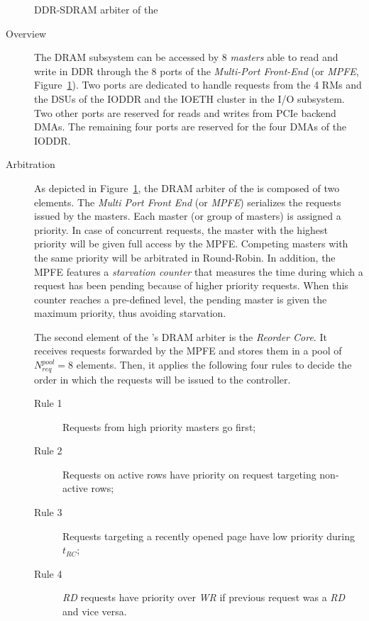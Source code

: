 \documentclass[main.tex]{subfiles}
\begin{document}
\begin{figure}
    \centering
    \scalebox{0.8}{}
    \caption{DDR-SDRAM arbiter of the \mppalong}
    \label{fig_execModel_MPPADRAMarbiter}
\end{figure}
\begin{description}
    \item[Overview]
        The DRAM subsystem can be accessed by 8 \emph{masters} able to read and write in DDR through the 8 ports of the \emph{Multi-Port Front-End} (or \emph{MPFE}, Figure~\ref{fig_execModel_MPPADRAMarbiter}). Two ports are dedicated to handle requests from the 4 RMs and the DSUs of the IODDR and the IOETH cluster in the I/O subsystem. Two other ports are reserved for reads and writes from PCIe backend DMAs. The remaining four ports are reserved for the four DMAs of the IODDR.
    \item[Arbitration]
        As depicted in Figure~\ref{fig_execModel_MPPADRAMarbiter}, the DRAM arbiter of the \mppalong is composed of two elements. The \emph{Multi Port Front End} (or \emph{MPFE}) serializes the requests issued by the masters. Each master (or group of masters) is assigned a priority. In case of concurrent requests, the master with the highest priority will be given full access by the MPFE. Competing masters with the same priority will be arbitrated in Round-Robin. In addition, the MPFE features a \emph{starvation counter} that measures the time during which a request has been pending because of higher priority requests. When this counter reaches a pre-defined level, the pending master is given the maximum priority, thus avoiding starvation.

        The second element of the \mppalong's DRAM arbiter is the \emph{Reorder Core}. It receives requests forwarded by the MPFE and stores them in a pool of $N_{req}^{pool}=8$ elements. Then, it applies the following four rules to decide the order in which the requests will be issued to the controller.

        \begin{description}
            \item[Rule 1] Requests from high priority masters go first;
            \item[Rule 2] Requests on active rows have priority on request targeting non-active rows;
            \item[Rule 3] Requests targeting a recently opened page have low priority during $t_{RC}$;
            \item[Rule 4] \emph{RD} requests have priority over \emph{WR} if previous request was a \emph{RD} and vice versa. 
        \end{description}


\end{description}
\end{document}
